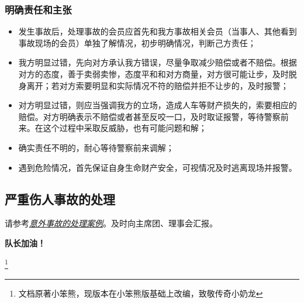 \documentclass[UTF8]{ctexart}
\begin{document}
\subsubsection{明确责任和主张}

\begin{itemize}[nosep,left=2em]
    \item 发生事故后，处理事故的会员应首先和我方事故相关会员（当事人、其他看到事故现场的会员）单独了解情况，初步明确情况，判断己方责任；
    \item 我方明显过错，先向对方承认我方错误，尽量争取减少赔偿或者不赔偿。根据对方的态度，善于卖弱卖惨，态度平和和对方商量，对方很可能让步，及时脱身离开；若对方索要明显和实际情况不符的赔偿并拒不让步的，及时报警；
    \item 对方明显过错，则应当强调我方的立场，造成人车等财产损失的，索要相应的赔偿。对方明确表示不赔偿或者甚至反咬一口，及时取证报警，等待警察前来。在这个过程中采取反威胁，也有可能问题和解；
    \item 确实责任不明的，耐心等待警察前来调解；
    \item 遇到危险情况，首先保证自身生命财产安全，可视情况及时逃离现场并报警。
\end{itemize}

\subsection{严重伤人事故的处理}

请参考\href{https://www.chexie.net/bbs/content/?bid=7&tid=839#5}{\textit{意外事故的处理案例}}。及时向主席团、理事会汇报。


\center\Large{\color{red}\textbf{队长加油！}}

\footnote{文档原著小笨熊，现版本在小笨熊版基础上改编，致敬传奇小奶龙}
\end{document}
